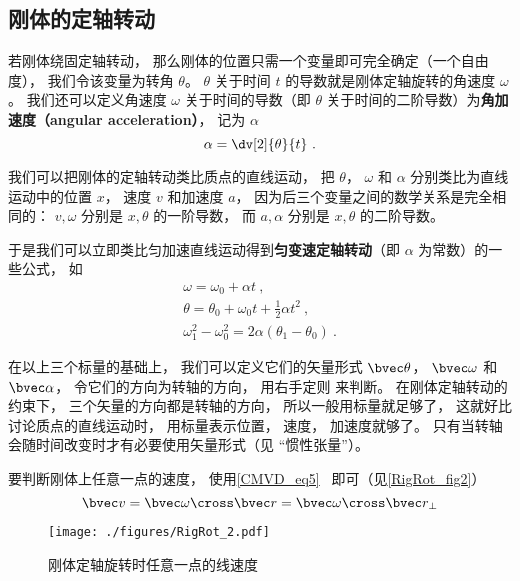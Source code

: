 

\subsection{刚体的定轴转动}
若刚体绕固定轴转动， 那么刚体的位置只需一个变量即可完全确定（一个自由度）， 我们令该变量为转角 $\theta$。 $\theta$ 关于时间 $t$ 的导数就是刚体定轴旋转的角速度 $\omega$。 我们还可以定义角速度 $\omega$ 关于时间的导数（即 $\theta$ 关于时间的二阶导数）为\textbf{角加速度（angular acceleration）}， 记为 $\alpha$
\begin{equation}
\alpha = \dv[2]{\theta}{t}~.
\end{equation}

我们可以把刚体的定轴转动类比质点的直线运动， 把 $\theta$， $\omega$ 和 $\alpha$ 分别类比为直线运动中的位置 $x$， 速度 $v$ 和加速度 $a$， 因为后三个变量之间的数学关系是完全相同的： $v, \omega$ 分别是 $x, \theta$ 的一阶导数， 而 $a, \alpha$ 分别是 $x, \theta$ 的二阶导数。

于是我们可以立即类比匀加速直线运动得到\textbf{匀变速定轴转动}（即 $\alpha$ 为常数）的一些公式， 如
\begin{gather}
\omega = \omega_0 + \alpha t~,\\
\theta = \theta_0 + \omega_0 t + \frac12 \alpha t^2~,\\
\omega_1^2 - \omega_0^2 = 2\alpha (\theta_1-\theta_0)~.
\end{gather}

在以上三个标量的基础上， 我们可以定义它们的矢量形式 $\bvec \theta$， $\bvec \omega$ 和 $\bvec \alpha$， 令它们的方向为转轴的方向， 用右手定则 来判断。 在刚体定轴转动的约束下， 三个矢量的方向都是转轴的方向， 所以一般用标量就足够了， 这就好比讨论质点的直线运动时， 用标量表示位置， 速度， 加速度就够了。 只有当转轴会随时间改变时才有必要使用矢量形式（见 “惯性张量”）。

要判断刚体上任意一点的速度， 使用\autoref{CMVD_eq5}~ 即可（见\autoref{RigRot_fig2}）
\begin{equation}
\bvec v = \bvec \omega \cross \bvec r = \bvec \omega \cross \bvec r_\bot
\end{equation}

\begin{figure}[ht]
\centering
\texttt{[image: ./figures/RigRot\_2.pdf]}
\caption{刚体定轴旋转时任意一点的线速度} \label{RigRot_fig2}
\end{figure}

